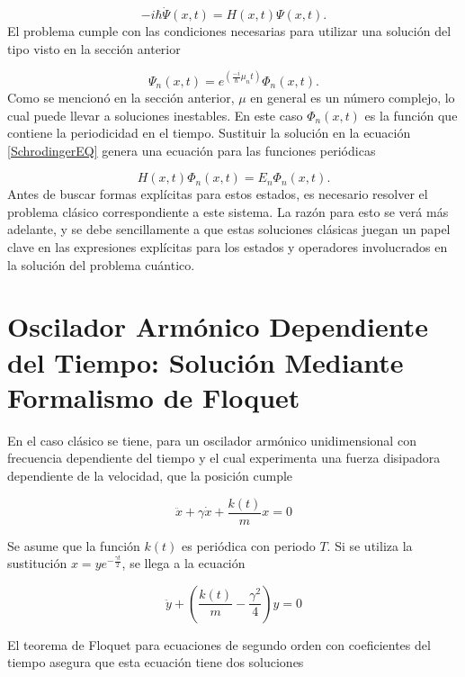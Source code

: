 \documentclass[10pt,a4paper]{report}
\begin{document}
\begin{equation}\label{SchrodingerEQ}
-i\hbar\dot{\Psi}(x,t) = H(x,t)\Psi(x,t).
\end{equation} El problema cumple con las condiciones necesarias para utilizar una solución del tipo visto en la sección anterior

\begin{equation}
\Psi_n(x,t) = e^{(\frac{-i}{\hbar}\mu_nt)}\Phi_n(x,t).
\end{equation} Como se mencionó en la sección anterior, $\mu$ en general es un número complejo, lo cual puede llevar a soluciones inestables. En este caso $\Phi_n(x,t)$ es la función que contiene la periodicidad en el tiempo. Sustituir la solución en la ecuación \eqref{SchrodingerEQ} genera una ecuación para las funciones periódicas

\begin{equation}
H(x,t)\Phi_n(x,t)=E_n\Phi_n(x,t).
\end{equation} Antes de buscar formas explícitas para estos estados, es necesario resolver el problema clásico correspondiente a este sistema. La razón para esto se verá más adelante, y se debe sencillamente a que estas soluciones clásicas juegan un papel clave en las expresiones explícitas para los estados y operadores involucrados en la solución del problema cuántico.

\section{Oscilador Armónico Dependiente del Tiempo: Solución Mediante Formalismo de Floquet}

En el caso clásico \cite{HanngiFM} se tiene, para un oscilador armónico unidimensional con frecuencia dependiente del tiempo y el cual experimenta una fuerza disipadora dependiente de la velocidad, que la posición cumple

\begin{equation}
\ddot{x}+\gamma\dot{x}+\frac{k(t)}{m}x=0
\end{equation}

Se asume que la función $k(t)$ es periódica con periodo $T$. Si se utiliza la sustitución $x=ye^{-\frac{\gamma t}{2}}$, se llega a la ecuación

\begin{equation}
\ddot{y} +(\frac{k(t)}{m}-\frac{\gamma^2}{4})y=0
\end{equation}

El teorema de Floquet para ecuaciones de segundo orden con coeficientes del tiempo \cite{HanngiFM} asegura que esta ecuación tiene dos soluciones
\end{document}

